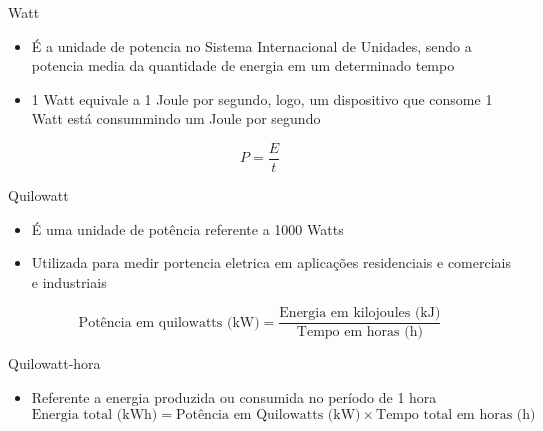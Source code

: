 \begin{frame}{Watt}
    \begin{itemize}
        \item É a unidade de potencia no Sistema Internacional de Unidades, sendo a potencia media da quantidade de energia em um determinado tempo
        \item 1 Watt equivale a 1 Joule por segundo, logo, um dispositivo que consome 1 Watt está consummindo um Joule por segundo
    \end{itemize}
    \begin{equation}
        P = \frac{E}{t}
    \end{equation}
\end{frame}

\begin{frame}{Quilowatt}
    \begin{itemize}
        \item É uma unidade de potência referente a 1000 Watts
        \item Utilizada para medir portencia eletrica em aplicações residenciais e comerciais e industriais
    \end{itemize}
    \begin{equation}
        \text{Potência em quilowatts (kW)} = \frac{\text{Energia em kilojoules (kJ)}}{\text{Tempo em horas (h)}}
        \end{equation}
\end{frame}

\begin{frame}{Quilowatt-hora}
    \begin{itemize}
        \item Referente a energia produzida ou consumida no período de 1 hora
        \begin{equation}
            \text{Energia total (kWh)} = \text{Potência em Quilowatts (kW)} \times \text{Tempo total em horas (h)}
            \end{equation}
    \end{itemize}
\end{frame}


